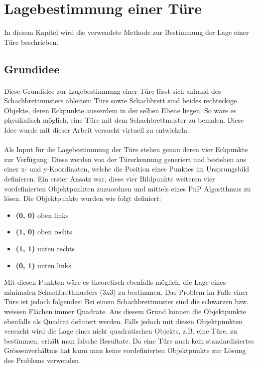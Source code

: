 \section{Lagebestimmung einer Türe}

In diesem Kapitel wird die verwendete Methode zur Bestimmung der Lage einer Türe beschrieben.


\subsection{Grundidee}

\paragraph{}
Diese Grundidee zur Lagebestimmung einer Türe lässt sich anhand des Schachbrettmusters ableiten: Türe sowie Schachbrett sind beides rechteckige Objekte, deren Eckpunkte ausserdem in der selben Ebene liegen. So wäre es physikalisch möglich, eine Türe mit dem Schachbrettmuster zu bemalen. 
Diese Idee wurde mit dieser Arbeit versucht virtuell zu entwickeln.
\\
\\
Als Input für die Lagebestimmung der Türe stehen genau deren vier Eckpunkte zur Verfügung. Diese werden von der Türerkennung generiert und bestehen aus einer x- und y-Koordinaten, welche die Position eines Punktes im Ursprungsbild definieren. Ein erster Ansatz war, diese vier Bildpunkte weiteren vier vordefinierten Objektpunkten zuzuordnen und mittels eines PnP Algorithmus zu lösen. Die Objektpunkte wurden wie folgt definiert:

\begin{itemize}
\item \textbf{(0, 0)} oben links
\item \textbf{(1, 0)} oben rechts
\item \textbf{(1, 1)} unten rechts
\item \textbf{(0, 1)} unten links
\end{itemize}
\noindent
Mit diesen Punkten wäre es theoretisch ebenfalls möglich, die Lage eines minimalen Schachbrettmusters (3x3) zu bestimmen. Das Problem im Falle einer Türe ist jedoch folgendes: Bei einem Schachbrettmuster sind die schwarzen bzw. weissen Flächen immer Quadrate. Aus diesem Grund können die Objektpunkte ebenfalls als Quadrat definiert werden. Falls jedoch mit diesen Objektpunkten versucht wird die Lage eines nicht quadratischen Objekts, z.B. eine Türe, zu bestimmen, erhält man falsche Resultate. Da eine Türe auch kein standardisiertes Grössenverhältnis hat kann man keine vordefinierten Objektpunkte zur Lösung des Problems verwenden.

